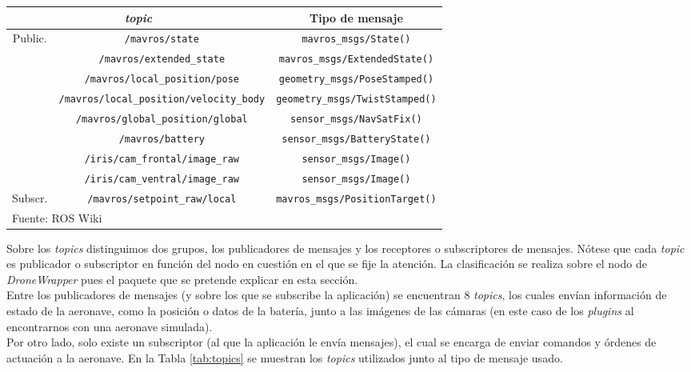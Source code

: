 \documentclass[../main.tex]{subfiles}
\begin{document}
\begin{table}[H]
	{\begin{tabular}{|c|c|c|}
		\hline
		\multicolumn{2}{|c|}{\textbf{\emph{topic}}} & \textbf{Tipo de mensaje} \\
		\hline
		\multirow{7}{*}{Public.} & \lstinline{/mavros/state} & \lstinline{mavros_msgs/State()} \\
		\cline{2-3}
		 & \lstinline{/mavros/extended_state} & \lstinline{mavros_msgs/ExtendedState()} \\
		\cline{2-3}
		 & \lstinline{/mavros/local_position/pose} & \lstinline{geometry_msgs/PoseStamped()} \\
		\cline{2-3}
		 & \lstinline{/mavros/local_position/velocity_body} & \lstinline{geometry_msgs/TwistStamped()} \\
		\cline{2-3}
		 & \lstinline{/mavros/global_position/global} & \lstinline{sensor_msgs/NavSatFix()} \\
		\cline{2-3}
		 & \lstinline{/mavros/battery} & \lstinline{sensor_msgs/BatteryState()} \\
		\cline{2-3}
		 & \lstinline{/iris/cam_frontal/image_raw} & \lstinline{sensor_msgs/Image()} \\
		\cline{2-3}
		 & \lstinline{/iris/cam_ventral/image_raw} & \lstinline{sensor_msgs/Image()} \\
		\hline
		Subscr. & \lstinline{/mavros/setpoint_raw/local} & \lstinline{mavros_msgs/PositionTarget()} \\
		\hline
		\multicolumn{3}{l}{Fuente: ROS Wiki}
	\end{tabular}}
\end{table}

Sobre los \emph{topics} distinguimos dos grupos, los publicadores de mensajes y los receptores o subscriptores de mensajes. Nótese que cada \emph{topic} es publicador o subscriptor en función del nodo en cuestión en el que se fije la atención. La clasificación se realiza sobre el nodo de \emph{DroneWrapper} pues el paquete que se pretende explicar en esta sección. \\
Entre los publicadores de mensajes (y sobre los que se subscribe la aplicación) se encuentran 8 \emph{topics}, los cuales envían información de estado de la aeronave, como la posición o datos de la batería, junto a las imágenes de las cámaras (en este caso de los \emph{plugins} al encontrarnos con una aeronave simulada). \\
Por otro lado, solo existe un subscriptor (al que la aplicación le envía mensajes), el cual se encarga de enviar comandos y órdenes de actuación a la aeronave. En la Tabla \ref{tab:topics} se muestran los \emph{topics} utilizados junto al tipo de mensaje usado.
\end{document}
